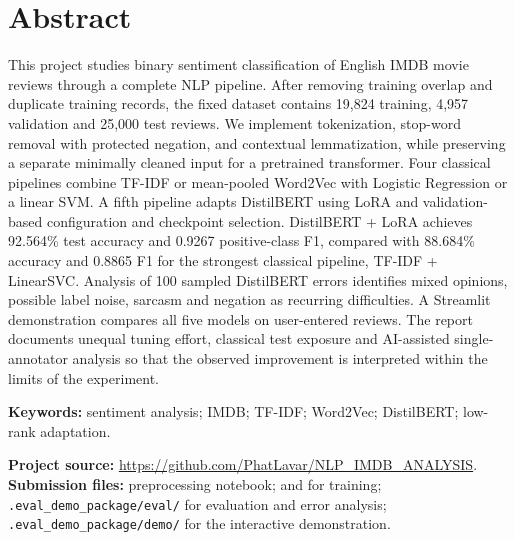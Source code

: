 \documentclass[11pt,a4paper]{article}
\DeclareRobustCommand{\code}[1]{\texttt{\detokenize{#1}}}
\DeclareRobustCommand{\pathcode}[1]{{\urlstyle{tt}\nolinkurl{#1}}}
\begin{document}
\hypersetup{pageanchor=true}
\section*{Abstract}
This project studies binary sentiment classification of English IMDB movie
reviews through a complete NLP pipeline. After removing training overlap and
duplicate training records, the fixed dataset contains 19,824 training, 4,957
validation and 25,000 test reviews. We implement tokenization, stop-word removal
with protected negation, and contextual lemmatization, while preserving a separate
minimally cleaned input for a pretrained transformer. Four classical pipelines
combine TF-IDF or mean-pooled Word2Vec with Logistic Regression or a linear SVM.
A fifth pipeline adapts DistilBERT using LoRA and validation-based configuration
and checkpoint selection. DistilBERT + LoRA achieves 92.564\% test accuracy and
0.9267 positive-class F1, compared with 88.684\% accuracy and 0.8865 F1 for the
strongest classical pipeline, TF-IDF + LinearSVC. Analysis of 100 sampled
DistilBERT errors identifies mixed opinions, possible label noise, sarcasm and
negation as recurring difficulties. A Streamlit demonstration compares all five
models on user-entered reviews. The report documents unequal tuning effort,
classical test exposure and AI-assisted single-annotator analysis so that the
observed improvement is interpreted within the limits of the experiment.

\noindent\textbf{Keywords:} sentiment analysis; IMDB; TF-IDF; Word2Vec;
DistilBERT; low-rank adaptation.
\vspace{5mm}

\noindent\textbf{Project source:}
\url{https://github.com/PhatLavar/NLP_IMDB_ANALYSIS}.\\
\textbf{Submission files:} preprocessing notebook; \code{ml/} and \code{dl/}
for training; \pathcode{.eval_demo_package/eval/} for evaluation and error analysis; \pathcode{.eval_demo_package/demo/}
for the interactive demonstration.
\clearpage
\begingroup\small\setlength{\parskip}{0pt}
\tableofcontents
\endgroup
\clearpage
\begingroup\small\setlength{\parskip}{0pt}
\listoffigures
\listoftables
\endgroup
\clearpage
{}








\clearpage
{}
{}

\clearpage
\appendix

\end{document}
